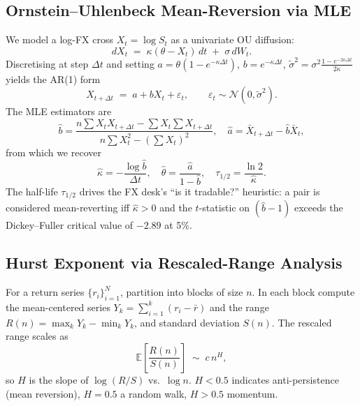\documentclass[conference]{IEEEtran}
\begin{document}
\subsection{Ornstein--Uhlenbeck Mean-Reversion via MLE}
\label{sec:ou}
We model a log-FX cross $X_t=\log S_t$ as a univariate OU diffusion:
\begin{equation}
dX_t \;=\; \kappa(\theta - X_t)\,dt \;+\; \sigma\,dW_t.
\label{eq:ousde}
\end{equation}
Discretising at step $\Delta t$ and setting $a\!=\!\theta(1-e^{-\kappa\Delta t})$, $b\!=\!e^{-\kappa\Delta t}$, $\tilde\sigma^2\!=\!\sigma^2\frac{1-e^{-2\kappa\Delta t}}{2\kappa}$ yields the AR(1) form
\begin{equation}
X_{t+\Delta t} \;=\; a + b X_t + \varepsilon_t,\qquad \varepsilon_t\sim\mathcal{N}(0,\tilde\sigma^2).
\label{eq:ouar1}
\end{equation}
The MLE estimators are
\begin{equation}
\hat b = \frac{n\sum X_t X_{t+\Delta t} - \sum X_t \sum X_{t+\Delta t}}{n\sum X_t^2 - (\sum X_t)^2},
\quad \hat a = \bar X_{t+\Delta t} - \hat b \bar X_t,
\end{equation}
from which we recover
\begin{equation}
\hat\kappa = -\frac{\log \hat b}{\Delta t},\quad
\hat\theta = \frac{\hat a}{1-\hat b},\quad
\tau_{1/2} = \frac{\ln 2}{\hat\kappa}.
\label{eq:halflife}
\end{equation}
The half-life $\tau_{1/2}$ drives the FX desk's ``is it tradable?'' heuristic: a pair is considered mean-reverting iff $\hat\kappa>0$ and the $t$-statistic on $(\hat b-1)$ exceeds the Dickey--Fuller critical value of $-2.89$ at 5\%.

\subsection{Hurst Exponent via Rescaled-Range Analysis}
\label{sec:hurst}
For a return series $\{r_i\}_{i=1}^{N}$, partition into blocks of size $n$. In each block compute the mean-centered series $Y_k=\sum_{i=1}^{k}(r_i-\bar r)$ and the range $R(n)=\max_k Y_k - \min_k Y_k$, and standard deviation $S(n)$. The rescaled range scales as
\begin{equation}
\mathbb{E}\!\left[\frac{R(n)}{S(n)}\right] \;\sim\; c\,n^H,
\label{eq:hurst}
\end{equation}
so $\hat H$ is the slope of $\log(R/S)$ vs.~$\log n$. $H<0.5$ indicates anti-persistence (mean reversion), $H=0.5$ a random walk, $H>0.5$ momentum.
\end{document}
